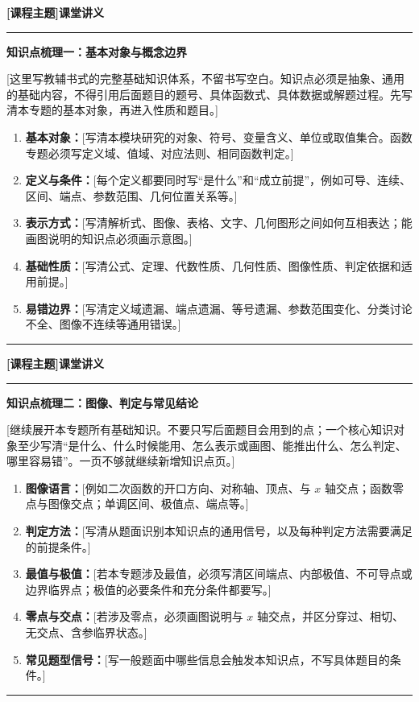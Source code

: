 \documentclass[12pt,a4paper]{ctexart}
\newcommand{\lessonTitle}[2]{
  \begin{center}
    {\LARGE\bfseries #1}
  \end{center}
  \vspace{0.2em}
  \hrule
  \vspace{0.8em}
}
\newcommand{\knowledgeBlock}[2]{
  \textbf{\large #1}

  \vspace{0.35em}
  #2
  \vspace{0.55em}
  \hrule
}
\begin{document}
\lessonTitle{[课程主题]课堂讲义}{}

\knowledgeBlock{知识点梳理一：基本对象与概念边界}{
  [这里写教辅书式的完整基础知识体系，不留书写空白。知识点必须是抽象、通用的基础内容，不得引用后面题目的题号、具体函数式、具体数据或解题过程。先写清本专题的基本对象，再进入性质和题目。]

  \begin{enumerate}
    \item \textbf{基本对象：}[写清本模块研究的对象、符号、变量含义、单位或取值集合。函数专题必须写定义域、值域、对应法则、相同函数判定。]
    \item \textbf{定义与条件：}[每个定义都要同时写“是什么”和“成立前提”，例如可导、连续、区间、端点、参数范围、几何位置关系等。]
    \item \textbf{表示方式：}[写清解析式、图像、表格、文字、几何图形之间如何互相表达；能画图说明的知识点必须画示意图。]
    \item \textbf{基础性质：}[写清公式、定理、代数性质、几何性质、图像性质、判定依据和适用前提。]
    \item \textbf{易错边界：}[写清定义域遗漏、端点遗漏、等号遗漏、参数范围变化、分类讨论不全、图像不连续等通用错误。]
  \end{enumerate}
}

\newpage
\lessonTitle{[课程主题]课堂讲义}{}

\knowledgeBlock{知识点梳理二：图像、判定与常见结论}{
  [继续展开本专题所有基础知识。不要只写后面题目会用到的点；一个核心知识对象至少写清“是什么、什么时候能用、怎么表示或画图、能推出什么、怎么判定、哪里容易错”。一页不够就继续新增知识点页。]

  \begin{enumerate}
    \item \textbf{图像语言：}[例如二次函数的开口方向、对称轴、顶点、与 $x$ 轴交点；函数零点与图像交点；单调区间、极值点、端点等。]
    \item \textbf{判定方法：}[写清从题面识别本知识点的通用信号，以及每种判定方法需要满足的前提条件。]
    \item \textbf{最值与极值：}[若本专题涉及最值，必须写清区间端点、内部极值、不可导点或边界临界点；极值的必要条件和充分条件都要写。]
    \item \textbf{零点与交点：}[若涉及零点，必须画图说明与 $x$ 轴交点，并区分穿过、相切、无交点、含参临界状态。]
    \item \textbf{常见题型信号：}[写一般题面中哪些信息会触发本知识点，不写具体题目的条件。]
  \end{enumerate}
}
\end{document}
